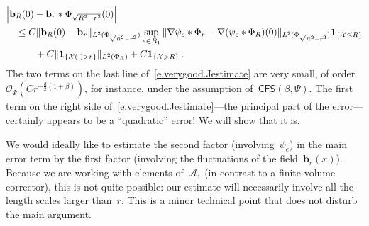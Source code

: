 \documentclass[11pt,twoside]{article} %
\numberwithin{equation}{section}
\theoremstyle{definition}
\newcommand*{\R}{\ensuremath{\mathbb{R}}}
\renewcommand{\b}{\ensuremath{\mathbf{b}}}
\renewcommand{\a}{\mathbf{a}}
\newcommand{\ahom}{\bar{\a}}
\newcommand{\X}{\mathcal{X}}
\renewcommand{\O}{\mathcal{O}}
\newcommand{\indc}{\boldsymbol{1}}
\newcommand{\minscale}{\chi}
\newcommand{\CFS}{\mathsf{CFS}}
\newcommand{\A}{\mathcal{A}}
\begin{document}
\begin{align}
\lefteqn{
\Bigl| 
 \b_R(0) - \b_r \ast \Phi_{\sqrt{R^2-r^2}} (0)
\Bigr|
} \quad & 
\notag \\ &
\leq
C \| \b_R(0)- \b_r\|_{L^2(\Phi_{\sqrt{R^2-r^2}})} 
\sup_{e \in B_1} 
\|  \nabla \psi_e \ast \Phi_{r}- \nabla (\psi_e \ast\Phi_R)(0) \|_{L^2(\Phi_{\sqrt{R^2-r^2}})} 
\indc_{\{\X \leq R \}}
\notag 
\\ & \qquad
+
C  \|   \indc_{\{\X(\cdot)>r\}} \|_{L^2(\Phi_{R})}  + C \indc_{\{\X > R \}}
\,.
\label{e.verygood.Jestimate}
\end{align}
The two terms on the last line of~\eqref{e.verygood.Jestimate} are very small, of order~$\O_\Psi(C r^{-\frac d2(1+\beta)})$, for instance, under the assumption of~$\CFS(\beta,\Psi)$. The first term on the right side of~\eqref{e.verygood.Jestimate}---the principal part of the error---certainly appears to be a ``quadratic'' error! We will show that it is. 


\smallskip

We would ideally like to estimate the second factor (involving~$\psi_e$) in the main error term by the first factor (involving the fluctuations of the field~$\b_r(x)$). Because we are working with elements of~$\A_1$ (in contrast to a finite-volume corrector), this is not quite possible: our estimate will necessarily involve all the length scales larger than~$r$. This is a minor technical point that does not disturb the main argument.
\end{document}
